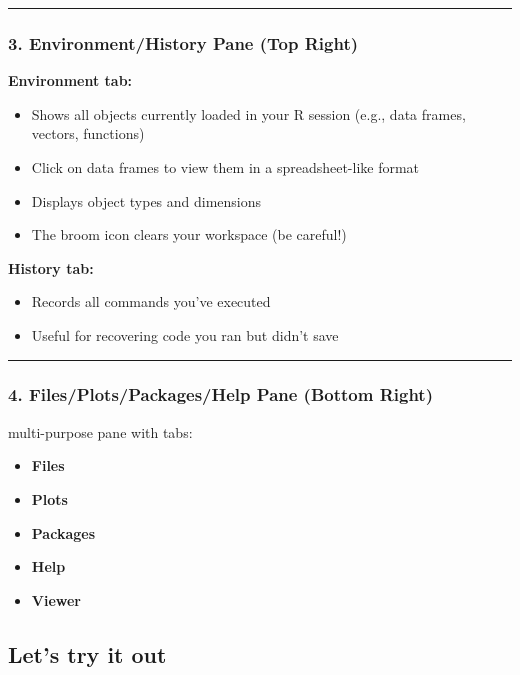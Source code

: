 \documentclass[
  letterpaper,
  DIV=11,
  numbers=noendperiod]{scrartcl}
\begin{document}
\begin{center}\rule{0.5\linewidth}{0.5pt}\end{center}

\subsubsection{3. Environment/History Pane (Top
Right)}\label{environmenthistory-pane-top-right}

\textbf{Environment tab:}

\begin{itemize}
\item
  Shows all objects currently loaded in your R session (e.g., data
  frames, vectors, functions)
\item
  Click on data frames to view them in a spreadsheet-like format
\item
  Displays object types and dimensions
\item
  The broom icon clears your workspace (be careful!)
\end{itemize}

\textbf{History tab:}

\begin{itemize}
\item
  Records all commands you've executed
\item
  Useful for recovering code you ran but didn't save
\end{itemize}

\begin{center}\rule{0.5\linewidth}{0.5pt}\end{center}

\subsubsection{4. Files/Plots/Packages/Help Pane (Bottom
Right)}\label{filesplotspackageshelp-pane-bottom-right}

multi-purpose pane with tabs:

\begin{itemize}
\item
  \textbf{Files}
\item
  \textbf{Plots}
\item
  \textbf{Packages}
\item
  \textbf{Help}
\item
  \textbf{Viewer}
\end{itemize}

\subsection{Let's try it out}\label{lets-try-it-out}
\end{document}
